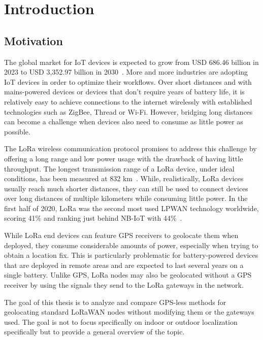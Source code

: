 \chapter{Introduction}

\section{Motivation}

The global market for \ac{IoT} devices is expected to grow from USD 686.46 billion in 2023 to USD 3,352.97 billion in 2030~\cite{statista_industrial_2023}.
More and more industries are adopting \ac{IoT} devices in order to optimize their workflows.
Over short distances and with mains-powered devices or devices that don't require years of battery life, it is relatively easy to achieve connections to the internet wirelessly with established technologies such as ZigBee, Thread or Wi-Fi.
However, bridging long distances can become a challenge when devices also need to consume as little power as possible.

The \ac{LoRa} wireless communication protocol promises to address this challenge by offering a long range and low power usage with the drawback of having little throughput.
The longest transmission range of a \ac{LoRa} device, under ideal conditions, has been measured at 832 km~\cite{the_things_network_global_team_lora_nodate}.
While, realistically, \ac{LoRa} devices usually reach much shorter distances, they can still be used to connect devices over long distances of multiple kilometers while consuming little power.
In the first half of 2020, \ac{LoRa} was the second most used \ac{LPWAN} technology worldwide, scoring 41\% and ranking just behind NB-IoT with 44\%~\cite{iot_analytics_lpwa_2020}.

While \ac{LoRa} end devices can feature \ac{GPS} receivers to geolocate them when deployed, they consume considerable amounts of power, especially when trying to obtain a location fix.
This is particularly problematic for battery-powered devices that are deployed in remote areas and are expected to last several years on a single battery.
Unlike \ac{GPS}, \ac{LoRa} nodes may also be geolocated without a \ac{GPS} receiver by using the signals they send to the \ac{LoRa} gateways in the network.

The goal of this thesis is to analyze and compare \ac{GPS}-less methods for geolocating standard \ac{LoRaWAN} nodes without modifying them or the gateways used.
The goal is not to focus specifically on indoor or outdoor localization specifically but to provide a general overview of the topic.

